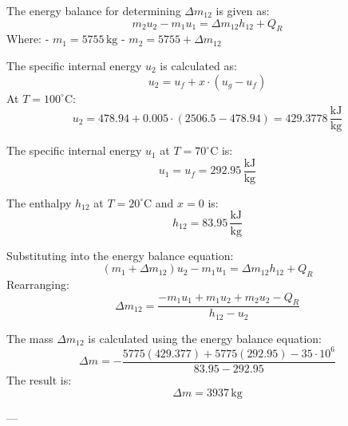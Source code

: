 The energy balance for determining \( \Delta m_{12} \) is given as:  
\[
m_2 u_2 - m_1 u_1 = \Delta m_{12} h_{12} + Q_R
\]  
Where:  
- \( m_1 = 5755 \, \text{kg} \)  
- \( m_2 = 5755 + \Delta m_{12} \)  

The specific internal energy \( u_2 \) is calculated as:  
\[
u_2 = u_f + x \cdot (u_g - u_f)
\]  
At \( T = 100^\circ\text{C} \):  
\[
u_2 = 478.94 + 0.005 \cdot (2506.5 - 478.94) = 429.3778 \, \frac{\text{kJ}}{\text{kg}}
\]  

The specific internal energy \( u_1 \) at \( T = 70^\circ\text{C} \) is:  
\[
u_1 = u_f = 292.95 \, \frac{\text{kJ}}{\text{kg}}
\]  

The enthalpy \( h_{12} \) at \( T = 20^\circ\text{C} \) and \( x = 0 \) is:  
\[
h_{12} = 83.95 \, \frac{\text{kJ}}{\text{kg}}
\]  

Substituting into the energy balance equation:  
\[
(m_1 + \Delta m_{12}) u_2 - m_1 u_1 = \Delta m_{12} h_{12} + Q_R
\]  
Rearranging:  
\[
\Delta m_{12} = \frac{-m_1 u_1 + m_1 u_2 + m_2 u_2 - Q_R}{h_{12} - u_2}
\]

The mass \( \Delta m_{12} \) is calculated using the energy balance equation:  
\[
\Delta m = - \frac{5775 (429.377) + 5775 (292.95) - 35 \cdot 10^6}{83.95 - 292.95}
\]  
The result is:  
\[
\Delta m = 3937 \, \text{kg}
\]  

---